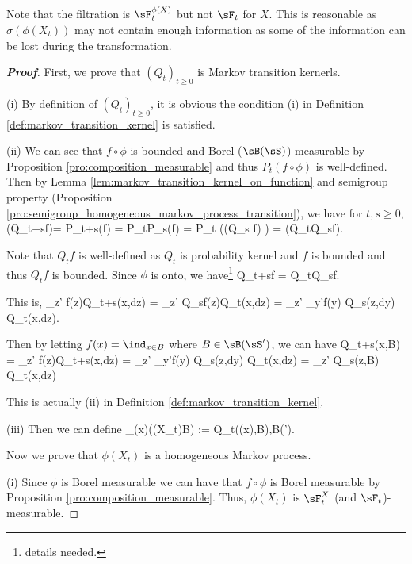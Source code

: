 \begin{remark}
Note that the filtration is $\sF_t^{\phi(X)}$ but not $\sF_t$ for $X$. This is reasonable as $\sigma(\phi(X_t))$ may not contain enough information as some of the information can be lost during the transformation.
\end{remark}

\begin{proof}[\bf Proof]
First, we prove that $(Q_t)_{t\geq 0}$ is Markov transition kernerls.

\ben
\item [(i)] By definition of $(Q_t)_{t\geq 0}$, it is obvious the condition (i) in Definition \ref{def:markov_transition_kernel} is satisfied.

\item [(ii)] We can see that $f\circ \phi$ is bounded and Borel ($\sB(\sS)$) measurable by Proposition \ref{pro:composition_measurable} and thus $P_t(f\circ \phi)$ is well-defined. Then by Lemma \ref{lem:markov_transition_kernel_on_function} and semigroup property (Proposition \ref{pro:semigroup_homogeneous_markov_process_transition}), we have for $t,s\geq 0$,
\be
(Q_{t+s}f)\circ \phi = P_{t+s}(f\circ \phi) = P_tP_s(f\circ \phi) = P_t ((Q_s f) \circ \phi) = (Q_tQ_sf)\circ \phi.
\ee

Note that $Q_t f$ is well-defined as $Q_t$ is probability kernel and $f$ is bounded and thus $Q_tf$ is bounded. Since $\phi$ is onto, we have\footnote{details needed.}
\be
Q_{t+s}f = Q_tQ_sf.
\ee

This is,
\be
\int_{z\in \sS'} f(z)Q_{t+s}(x,dz) = \int_{z\in \sS'} Q_sf(z)Q_{t}(x,dz) = \int_{z\in \sS'} \int_{y\in \sS'}f(y) Q_s(z,dy) Q_{t}(x,dz).
\ee

Then by letting $f(x) = \ind_{x\in B}$ where $B\in \sB(\sS')$, we can have
\be
Q_{t+s}(x,B) = \int_{z\in \sS'} f(z)Q_{t+s}(x,dz)  = \int_{z\in \sS'} \int_{y\in \sS'}f(y) Q_s(z,dy) Q_t(x,dz) = \int_{z\in \sS'} Q_s(z,B) Q_t(x,dz)
\ee

This is actually (ii) in Definition \ref{def:markov_transition_kernel}.

\item [(iii)] Then we can define
\be
\Q_{\phi(x)}(\phi(X_t)\in B) := Q_t({\phi(x)},B),\qquad \forall B\in \sB(\sS').
\ee
\een

Now we prove that $\phi(X_t)$ is a homogeneous Markov process.
\ben
\item [(i)] Since $\phi$ is Borel measurable we can have that $f\circ \phi$ is Borel measurable by Proposition \ref{pro:composition_measurable}. Thus, $\phi(X_{t})$ is $\sF_t^{X}$ (and $\sF_t$)-measurable.


\end{proof}
